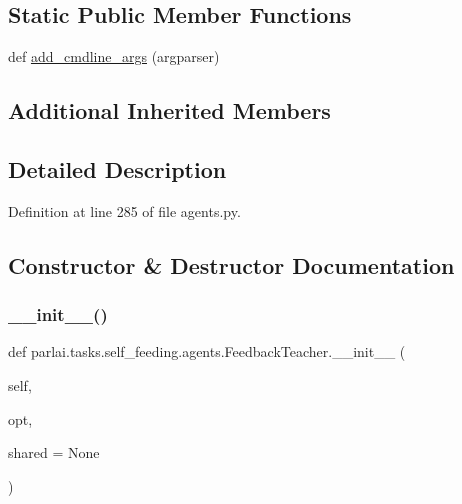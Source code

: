 \subsection*{Static Public Member Functions}
\begin{DoxyCompactItemize}
\item 
def \hyperlink{classparlai_1_1tasks_1_1self__feeding_1_1agents_1_1FeedbackTeacher_ad574b840424ec2d7096639c198af08c7}{add\+\_\+cmdline\+\_\+args} (argparser)
\end{DoxyCompactItemize}
\subsection*{Additional Inherited Members}


\subsection{Detailed Description}


Definition at line 285 of file agents.\+py.



\subsection{Constructor \& Destructor Documentation}
\mbox{\label{classparlai_1_1tasks_1_1self__feeding_1_1agents_1_1FeedbackTeacher_aafb96d12c0ae083d89bcf0365c2dfb6e}} 
\subsubsection{\texorpdfstring{\+\_\+\+\_\+init\+\_\+\+\_\+()}{\_\_init\_\_()}}
{\footnotesize\ttfamily def parlai.\+tasks.\+self\+\_\+feeding.\+agents.\+Feedback\+Teacher.\+\_\+\+\_\+init\+\_\+\+\_\+ (\begin{DoxyParamCaption}\item[{}]{self,  }\item[{}]{opt,  }\item[{}]{shared = {\ttfamily None} }\end{DoxyParamCaption})}



